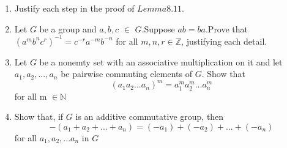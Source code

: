 \documentclass[11pt]{amsbook}
\begin{document}
	\begin{enumerate}
		\item Justify each step in the proof of $ Lemma  8.11.$ %
		\item Let $G$ be a group and $a,b,c$ $\in$ $G$.Suppose $ab=ba$.Prove that $(a^{m}b^{n}c^{r})^{-1} = c^{-r}a^{-m}b^{-n}$ for all $m,n,r \in \mathbb{Z}$,
		justifying each detail.
		\item Let $G$ be a nonemty set with an associative multiplication on it and let $a_{1},a_{2},...,a_{n}$ be pairwise commuting elements of $G$. Show that
		\begin{equation*}
			(a_{1}a_{2}...a_{n})^{m} = a_{1}^{m}a_{2}^{m}...a_{n}^{m}
		\end{equation*}
		for all m $\in\mathbb{N}$
		\item Show that, if $G$ is an additive commutative group, then
		\begin{equation*}
			-(a_{1}+a_{2}+...+a_{n})=(-a_1)+(-a_2)+...+(-a_n)
		\end{equation*}
		for all $ a_{1},a_{2},...a_{n}$ in $G$
	\end{enumerate}
\end{document}
